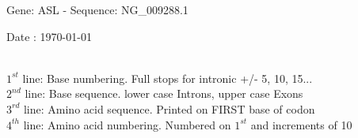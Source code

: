 \documentclass{article}
\begin{document}
\renewcommand{\footrulewidth}{1pt}
\renewcommand{\headrulewidth}{0pt}
\begin{center}
\begin{large}
 Gene: ASL - Sequence: NG\_009288.1
 
 Date : \today\\\\
\end{large}
\end{center}
$1^{st}$ line: Base numbering. Full stops for intronic +/- 5, 10, 15...\\
$2^{nd}$ line: Base sequence. lower case Introns, upper case Exons\\
$3^{rd}$ line: Amino acid sequence. Printed on FIRST base of codon\\
$4^{th}$ line: Amino acid numbering. Numbered on $1^{st}$ and increments of 10\\
\end{document}
